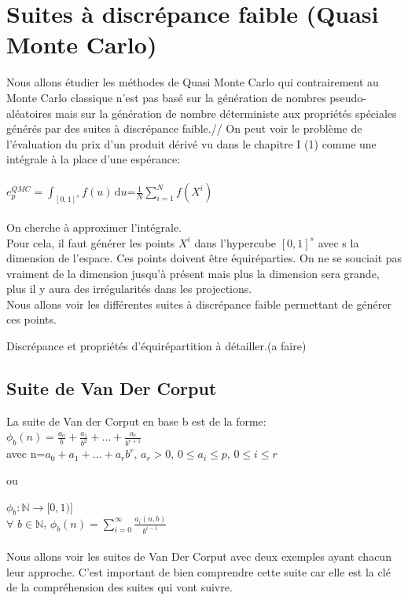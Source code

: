 \documentclass[12pt]{report}
\begin{document}
\section{Suites à discrépance faible (Quasi Monte Carlo)}
Nous allons étudier les méthodes de Quasi Monte Carlo qui contrairement au Monte Carlo classique n'est pas basé sur la génération de nombres pseudo-aléatoires mais sur la génération de nombre déterministe aux propriétés spéciales générés par des suites à discrépance faible.//
On peut voir le problème de l'évaluation du prix d'un produit dérivé vu dans le chapitre I (1)  comme une intégrale à la place d'une espérance:\\\\
$e_p^{QMC}=$$\int_{[0,1]^s} f(u) \, \mathrm du$=$\frac{1}{N}\sum_{i=1}^{N}f(X^i)$\\\\
On cherche à approximer l'intégrale.\\
Pour cela, il faut générer les points $X^i$ dans l'hypercube $[0,1]^s$ avec s la dimension de l'espace.
Ces points doivent être équiréparties.
On ne se souciait pas vraiment de la dimension jusqu'à présent mais plus la dimension sera grande, plus il y aura des irrégularités dans les projections.\\
Nous allons voir les différentes suites à discrépance faible permettant de générer ces points.


Discrépance et propriétés d'équirépartition à détailler.(a faire)
\subsection{Suite de Van Der Corput}

La suite de Van der Corput en base b est de la forme:\\
$\phi_b(n)=\frac{a_o}{b}+\frac{a_1}{b^2}+...+\frac{a_r}{b^{r+1}}$\\ avec n=$a_0+a_1+...+a_rb^r$, $a_r>0$, $0\leq a_i \leq p$, $0\leq i \leq r$
\begin{center}
	ou \\
\end{center}
$\phi_b: \mathbb{N} \rightarrow[0,1)$]\\
$\forall$ $ b\in \mathbb{N}$, $\phi_b(n)=\sum_{i=0}^{\infty}\frac{a_i(n,b)}{b^{i-1}}$\\\\

Nous allons voir les suites de Van Der Corput avec deux exemples ayant chacun leur approche. C'est important de bien comprendre cette suite car elle est la clé de la compréhension des suites qui vont suivre.\\\\
\end{document}
